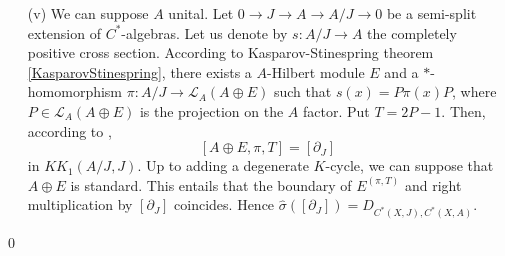 \begin{dem}
\begin{enumerate}
\item[(v)] We can suppose $A$ unital. Let $0 \rightarrow J \rightarrow A \rightarrow A /J \rightarrow 0$ be a semi-split extension of $C^*$-algebras. Let us denote by $s : A/J \rightarrow A $ the completely positive cross section.  According to Kasparov-Stinespring theorem \ref{KasparovStinespring}, there exists a $A$-Hilbert module $E$ and a $*$-homomorphism $\pi : A/J \rightarrow \mathcal L_{A}(A\oplus E)$ such that $s(x) = P \pi(x) P$, where $P \in \mathcal L_{A}(A\oplus E)$ is the projection on the $A$ factor. Put $T= 2P-1$. Then, according to \cite{SkandalisExtension}, 
\[[A\oplus E, \pi , T] = [\partial_J]\]
in $KK_1(A/J,J)$. Up to adding a degenerate $K$-cycle, we can suppose that $A\oplus E$ is standard. This entails that the boundary of $E^{(\pi,T)}$ and right multiplication by $[\partial_J]$ coincides. Hence $\hat\sigma([\partial_J]) = D_{C^*(X,J),C^*(X,A)}$.
\end{enumerate}
\qed
\end{dem}

